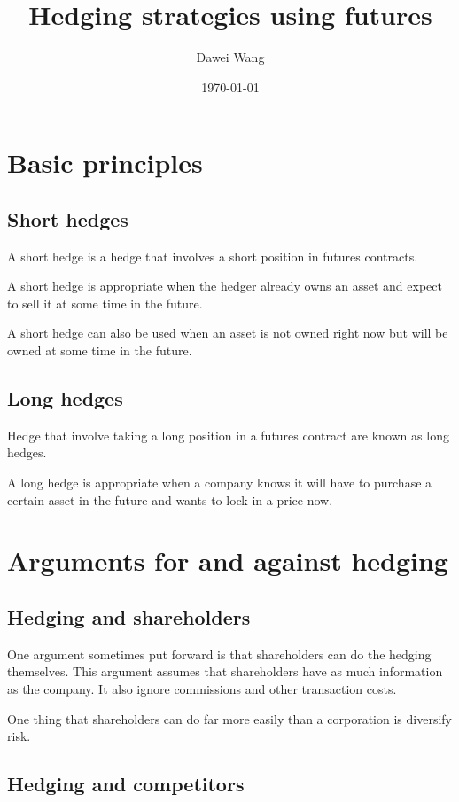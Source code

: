 \documentclass{article}
\title{Hedging strategies using futures}
\author{Dawei Wang}
\date{\today}
\begin{document}
	\maketitle
\section{Basic principles}
\subsection{Short hedges}
\hspace*{\fill}

A short hedge is a hedge that involves a short position in futures contracts. 

A short hedge is appropriate when the hedger already owns an asset and expect to sell it at some time in the future.

A short hedge can also be used when an asset is not owned right now but will be owned at some time in the future.

\subsection{Long hedges}
\hspace*{\fill}

Hedge that involve taking a long position in a futures contract are known as long hedges.

A long hedge is appropriate when a company knows it will have to purchase a certain asset in the future and wants to lock in a price now.

\section{Arguments for and against hedging}
\subsection{Hedging and shareholders}
\hspace*{\fill}

One argument sometimes put forward is that shareholders can do the hedging themselves. This argument assumes that shareholders have as much information as the company. It also ignore commissions and other transaction costs.

One thing that shareholders can do far more easily than a corporation is diversify risk.

\subsection{Hedging and competitors}
\hspace*{\fill}
\end{document}
